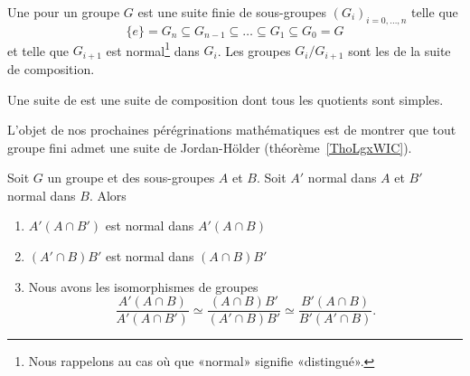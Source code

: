 
\begin{definition}  \label{DefJWZSooNcntfK}
Une  pour un groupe \( G\) est une suite finie de sous-groupes \( (G_i)_{i=0,\ldots, n}\) telle que
\begin{equation}
    \{ e \}=G_n\subseteq G_{n-1}\subseteq\ldots\subseteq G_1\subseteq G_0=G
\end{equation}
et telle que \( G_{i+1}\) est normal\footnote{Nous rappelons au cas où que «normal» signifie «distingué».} dans \( G_i\). Les groupes \( G_i/G_{i+1}\) sont les  de la suite de composition.

    Une suite de  est une suite de composition dont tous les quotients sont simples.
\end{definition}
L'objet de nos prochaines pérégrinations mathématiques est de montrer que tout groupe fini admet une suite de Jordan-Hölder (théorème~\ref{ThoLgxWIC}).

\begin{lemma}\label{LemsKpXCG}
    Soit \( G\) un groupe et des sous-groupes \( A\) et \( B\). Soit \( A'\) normal dans \( A\) et \( B'\) normal dans \( B\). Alors
    \begin{enumerate}
        \item
            \( A'(A\cap B')\) est normal dans \( A'(A\cap B)\)
        \item
            \( (A'\cap B)B'\) est normal dans \( (A\cap B)B'\)
        \item
            Nous avons les isomorphismes de groupes
            \begin{equation}
                \frac{ A'(A\cap B) }{ A'(A\cap B') }\simeq\frac{ (A\cap B)B' }{ (A'\cap B)B' }\simeq\frac{ B'(A\cap B) }{ B'(A'\cap B) }.
            \end{equation}
    \end{enumerate}
\end{lemma}


